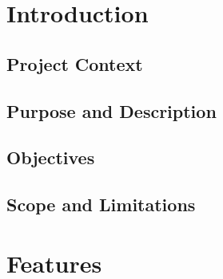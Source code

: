 \documentclass{article}
\author{Jonel C. Ganalon}
\date{19 March 2024}
\begin{document}
\section{Introduction}



\subsection{Project Context}






\subsection{Purpose and Description}



\subsection{Objectives}

\subsection{Scope and Limitations}

\section{Features}

\end{document}
